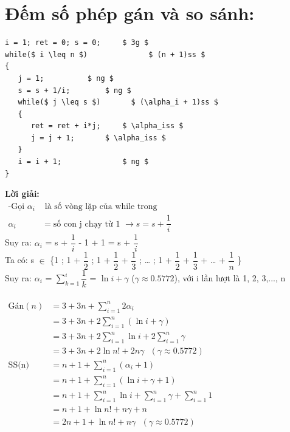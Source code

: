 \documentclass[12pt, letterpaper]{article}
\begin{document}
\section{Đếm số phép gán và so sánh:}
\begin{lstlisting}
i = 1; ret = 0; s = 0;     $ 3g $
while($ i \leq n $)        		 $ (n + 1)ss $
{
   j = 1;		   $ ng $
   s = s + 1/i;		   $ ng $
   while($ j \leq s $)		 $ (\alpha_i + 1)ss $
   {
      ret = ret + i*j;	   $ \alpha_iss $
      j = j + 1;	   $ \alpha_iss $
   }
   i = i + 1;	           $ ng $
}
\end{lstlisting}
\textbf{Lời giải:} \\
$ \begin{aligned}
	\text{-Gọi } \alpha_i & \text{ là số vòng lặp của while trong}                        &  & \\
	              \alpha_i & = \text{số con j chạy từ 1 } \rightarrow s = s + \dfrac{1}{i}
\end{aligned} $ \\
Suy ra: $\alpha_i$ = s + $\dfrac{1}{i}$ - 1 + 1 = s + $\dfrac{1}{i}$ \\
Ta có: s $\in$ \{1 ; 1 + $\dfrac{1}{2}$ ; 1 + $\dfrac{1}{2}$ + $\dfrac{1}{3}$ ; … ; 1 + $\dfrac{1}{2}$ + $\dfrac{1}{3}$ + … + $\dfrac{1}{n}$ \} \\
Suy ra: $\alpha_i$ = $\sum_{k=1}^i \dfrac{1}{k}$ = $\ln i + \gamma$ ($\gamma \approx 0.5772$), với i lần lượt là 1, 2, 3,..., n \\
 \\
$ \begin{aligned}
	\text{Gán}(n) & = 3 + 3n + \sum_{i=1}^n 2\alpha_i  \\
	              & = 3 + 3n + 2\sum_{i=1}^n (\ln i + \gamma) \\
				  & = 3 + 3n + 2\sum_{i=1}^n \ln i + 2\sum_{i=1}^n \gamma \\
				  & = 3 + 3n + 2\ln n! + 2n \gamma \text{ }(\gamma \approx 0.5772) \\
	\text{SS(n) } & = n + 1 + \sum_{i=1}^n (\alpha_i + 1) \\
	              & = n + 1 + \sum_{i=1}^n (\ln i + \gamma + 1) \\
				  & = n + 1 + \sum_{i=1}^n \ln i + \sum_{i=1}^n \gamma + \sum_{i=1}^n 1 \\
				  & = n + 1 + \ln n! + n \gamma + n \\
				  & = 2n + 1 + \ln n! + n \gamma \text{ }(\gamma \approx 0.5772) \\
\end{aligned} $ \\
\end{document}
